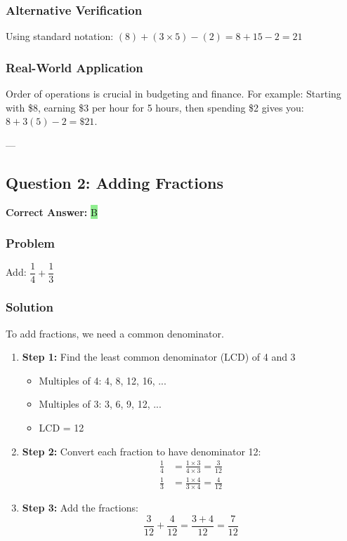 \documentclass[12pt]{article}
\begin{document}
\subsubsection*{Alternative Verification}
Using standard notation: $(8) + (3 \times 5) - (2) = 8 + 15 - 2 = 21$ 

\subsubsection*{Real-World Application}
Order of operations is crucial in budgeting and finance. For example: Starting with \$8, earning \$3 per hour for 5 hours, then spending \$2 gives you: $8 + 3(5) - 2 = \$21$.

---

\subsection{Question 2: Adding Fractions}

\textbf{Correct Answer: } \colorbox{lightgreen}{B}

\subsubsection*{Problem}
Add: $\dfrac{1}{4} + \dfrac{1}{3}$

\subsubsection*{Solution}

To add fractions, we need a common denominator.

\begin{enumerate}
\item \textbf{Step 1:} Find the least common denominator (LCD) of 4 and 3
  \begin{itemize}
  \item Multiples of 4: 4, 8, 12, 16, ...
  \item Multiples of 3: 3, 6, 9, 12, ...
  \item LCD = 12
  \end{itemize}
\item \textbf{Step 2:} Convert each fraction to have denominator 12:
  \begin{align*}
  \frac{1}{4} &= \frac{1 \times 3}{4 \times 3} = \frac{3}{12} \\
  \frac{1}{3} &= \frac{1 \times 4}{3 \times 4} = \frac{4}{12}
  \end{align*}
\item \textbf{Step 3:} Add the fractions:
  \[
  \frac{3}{12} + \frac{4}{12} = \frac{3 + 4}{12} = \frac{7}{12}
  \]
\end{enumerate}
\end{document}
